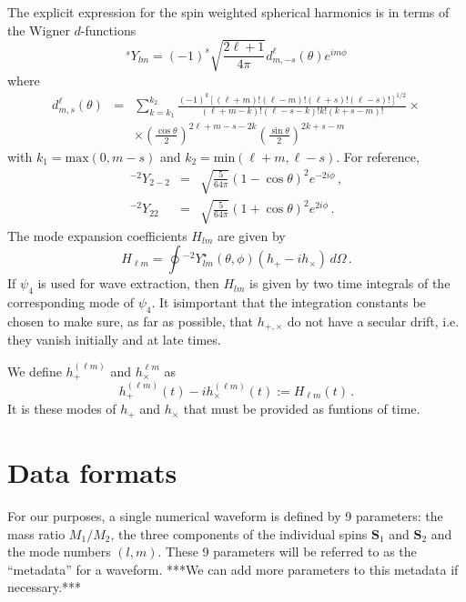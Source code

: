 \documentclass[amsmath,amssymb]{article}
\begin{document}
The explicit expression for the spin weighted spherical harmonics is
in terms of the Wigner $d$-functions
\begin{equation}
  \label{eq:5}
   {}^sY_{lm} = (-1)^s\sqrt{\frac{2\ell+1}{4\pi}} d^\ell_{m,-s}(\theta)e^{im\phi}
\end{equation}
where
\begin{eqnarray}
  \label{eq:6}
  d^\ell_{m,s}(\theta) &=& \sum_{k = k_1}^{k_2}
    \frac{(-1)^k[(\ell+m)!(\ell-m)!(\ell+s)!(\ell-s)!]^{1/2}}{(\ell +m
      -k)!(\ell-s-k)!k!(k+s-m)!} \times \\ 
    &&\times \left(\frac{\cos\theta}{2}\right)^{2\ell+m-s-2k}\left(\frac{\sin\theta}{2}\right)^{2k+s-m}  
\end{eqnarray}
with $k_1 = \textrm{max}(0, m-s)$ and $k_2=\textrm{min}(\ell+m,
\ell-s)$.  For reference,
\begin{eqnarray}
  \label{eq:7}
  {}^{-2}Y_{2-2} &=& \sqrt{\frac{5}{64\pi}}(1-\cos\theta)^2e^{-2i\phi}\,, \\
  {}^{-2}Y_{22} &=& \sqrt{\frac{5}{64\pi}}(1+\cos\theta)^2e^{2i\phi} \,.
\end{eqnarray}
The mode expansion coefficients $H_{lm}$ are given by
\begin{equation}
  \label{eq:10}
  H_{\ell m} = \oint {}^{-2}Y_{lm}^\star(\theta,\phi)(h_+-ih_\times )\,d\Omega\,.
\end{equation}
If $\psi_4$ is used for wave extraction, then $H_{lm}$ is given by two
time integrals of the corresponding mode of $\psi_4$.  It isimportant
that the integration constants be chosen to make sure, as far as
possible, that $h_{+,\times}$ do not have a secular drift, i.e. they
vanish initially and at late times.  

We define $h_+^{(\ell m)}$ and $h_\times^{\ell m}$ as
\begin{equation}
  \label{eq:11}
  h_+^{(\ell m)}(t) -ih_\times^{(\ell m)}(t) := H_{\ell m}(t)\,.  
\end{equation}
It is these modes of $h_+$ and $h_\times$ that must be provided as
funtions of time.  





\section{Data formats}
\label{sec:format}


For our purposes, a single numerical waveform is defined by 9
parameters: the mass ratio $M_1/M_2$, the three components of the
individual spins $\mathbf{S}_1$ and $\mathbf{S}_2$ and the mode
numbers $(l,m)$.  These 9 parameters will be referred to as the
``metadata'' for a waveform.  ***We can add more parameters to this
metadata if necessary.***
\end{document}
